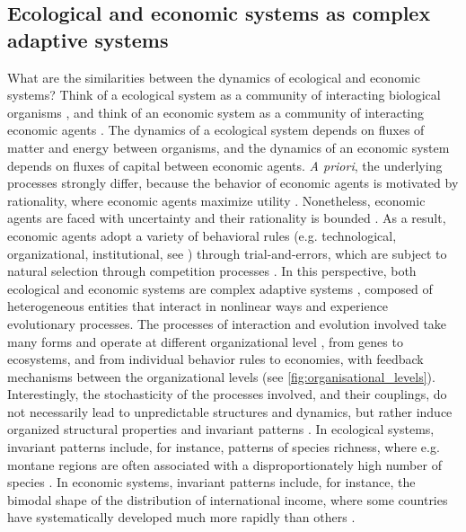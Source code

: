\subsection{Ecological and economic systems as complex adaptive systems}
What are the similarities between the dynamics of ecological and economic systems? 
% 
Think of a ecological system as a community of interacting biological organisms \citep{chapin2002principles}, and think of an economic system as a community of interacting economic agents \citep{Dopfer2007}.
% 
The dynamics of a ecological system depends on fluxes of matter and energy between organisms, and the dynamics of an economic system depends on fluxes of capital between economic agents.
% 
\textit{A priori}, the underlying processes strongly differ, because the behavior of economic agents is motivated by rationality, where economic agents maximize utility \citep{10.1093/cje/bet027}. 
% 
Nonetheless, economic agents are faced with uncertainty \citep{Foster2012} and their rationality is bounded \citep{Veblen1898,nelson1985evolutionary}. As a result, economic agents adopt a variety of behavioral rules (e.g. technological, organizational, institutional, see \cite{Foster2012}) through trial-and-errors, which are subject to natural selection through competition processes \citep{schumpeter2017theory}.
% 
In this perspective, both ecological and economic systems are complex adaptive systems \citep{Levin2002}, composed of heterogeneous entities that interact in nonlinear ways and experience evolutionary processes. 
% 
% 
The processes of interaction and evolution involved take many forms and operate at different organizational level \citep{Levin1998}, from genes to ecosystems, and from individual behavior rules to economies, with feedback mechanisms between the organizational levels (see \cref{fig:organisational_levels}).
% 
Interestingly, the stochasticity of the processes involved, and their couplings, do not necessarily lead to unpredictable structures and dynamics, but rather induce organized structural properties and invariant patterns \citep{Olff2009,mitchell2009complexity}. 
% 
In ecological systems, invariant patterns include, for instance, patterns of species richness, where e.g. montane regions are often associated with a disproportionately high number of species \citep{Rahbek2019}. In economic systems, invariant patterns include, for instance, the bimodal shape of the distribution of international income, where some countries have systematically developed much more rapidly than others \citep{acemoglu2001colonial}. 
